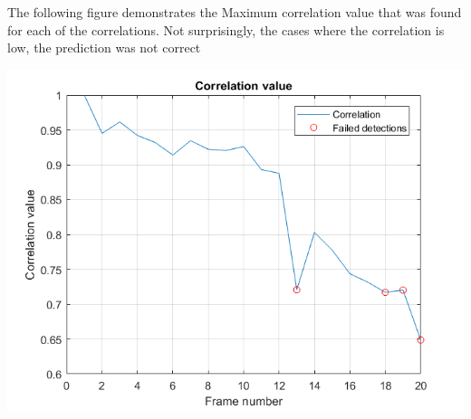 \documentclass[a4paper]{iacas}
\begin{document}
The following figure demonstrates the Maximum correlation value that was found for each of the correlations. Not surprisingly, the cases where the correlation is low, the prediction was not correct
\vskip 0.1in
\begin{minipage}{0.5\textwidth}
\centering
	\includegraphics[scale=0.8]{output/q4/algo_1/corr_graph.png}
\end{minipage}
\vskip 0.1in
\end{document}
